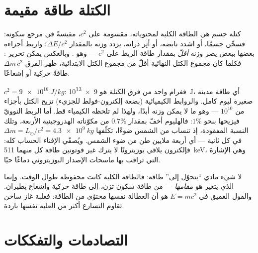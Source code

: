 \section{الكتلة طاقة مقيمة}

\begin{theorem}\label{thm:b3:relativistic-dynamics:emc2}
كتلة جسم هي الطاقة الكلية لمحتوياته، مقسومة على
$c^2$، مقيسةً في مرجع سكونه: فسخّن جسمًا، أو اشدد نابضه، أو
أثِر ذراته، يزدد وزنه بالمقدار $\Delta E/c^2$؛ واربط أجزاءه
بعضها ببعض يصر وزنه \emph{أقلّ} بمقدار طاقة الربط على $c^2$
--- وهو \emph{}. وبالعكس يمكن تحرير :
فكلما كان مجموع الكتل النهائية أقلّ من مجموع الكتل الابتدائية،
ظهر الفرق $\Delta m\,c^2$ طاقةً حركية أو إشعاعًا.
\end{theorem}
\admitted

\begin{example}\label{ex:b3:relativistic-dynamics:ledger}
$c^2 = \qty{9e16}{J/kg}$: فغرام واحد من فرق الكتلة هو
\qty{9e13}{J}، أي طاقة مدينة صغيرة ليوم كامل. والروابط الكيميائية
(بضعة إلكترون-فولط للجزيء) تزيح الكتل بأجزاء من $10^{10}$ ---
وهو ما لا يمكن وزنه أبدًا، ولهذا لم تلحظه الكيمياء قط. أما الربط
النوويّ فيزيحها بنحو $1\%$: فالهليوم أخفّ بمقدار $0.7\%$ من
مكوّناته الهدروجينية الأربعة، وتلك النسبة المفقودة، إذ تنساب
من الشمس ضوءًا، تكلّفها $\Delta m = L_\odot/c^2 =
\qty{4.3e9}{kg}$ في كل ثانية --- أي أربعة ملايين طن من ضوء الشمس.
ويُصفّي الإفناء الحساب كله: فإلكترون يلاقي بوزيترونًا لا يترك
غير فوتونين طاقة كل منهما \qty{511}{keV}، وهي الإشارة التي
تراقب بها ماسحات الإصدار البوزيتروني دماغًا حيًا.
\end{example}

\begin{remark}\label{rem:b3:relativistic-dynamics:conversion}
لا شيء مادي ``يتحوّل إلى'' طاقة: فالطاقة الكلية كانت محفوظة
طوال الوقت. وإنما الذي يتغير هو \emph{مقامها} --- من طاقة سكون
تزن، إلى طاقة حركية وإشعاع يطيران. والقول العميق في
$E = mc^2$ هو أن العطالة نفسها محتوًى من الطاقة:
فعلبة غاز ساخن تقاوم التسارع أكثر من العلبة نفسها باردة.
\end{remark}

\section{التصادمات والتفككات}

